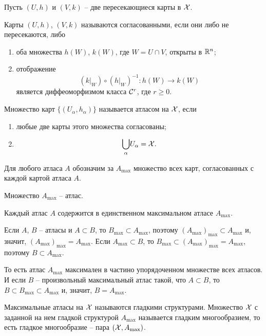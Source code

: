 	\begin{mdef}
		Пусть $(U, h)$ и $(V, k)$ -- две пересекающиеся карты в $\mathcal{X}$.
		
		Карты $(U, h)$, $(V, k)$ называются согласованными, если они либо не пересекаются, либо
		\begin{enumerate}
			\item оба множества $h(W)$, $k(W)$, где $W= U \cap V$, открыты в $\mathbb{R}^n$;
			\item отображение
			$$
				\left( \left. k \right|_W \right) \circ \left( \left. h \right|_W \right)^{-1}\colon h(W) \to k(W)
			$$
			является диффеоморфизмом класса $\mathcal{C}^r$, где $r \ge 0$.
		\end{enumerate}
	\end{mdef}

	\begin{mdef}
		Множество карт $\{ (U_\alpha, h_\alpha)\}$ называется атласом на $\mathcal{X}$, если
		\begin{enumerate}
			\item любые две карты этого множества согласованы;
			\item $$
				\underset{\alpha}{\bigcup}U_\alpha = \mathcal{X}.
			$$
		\end{enumerate}
	\end{mdef}
	
	Для любого атласа $A$ обозначим за $A_{\max}$ множество всех карт, согласованных с каждой картой атласа $A$.
	
	\begin{theorem}
		Множество $A_{\max}$ -- атлас.
	\end{theorem}

	\begin{corollary}
		Каждый атлас $A$ содержится в единственном максимальном атласе $A_{\max}$.
	\end{corollary}
	\begin{Proof}
		Если $A$, $B$ -- атласы и $A \subset B$, то $B_{\max} \subset A_{\max}$, поэтому $(A_{\max})_{\max} \subset A_{\max}$ и, значит, $(A_{\max})_{\max} = A_{\max}$.
	Если $A_{\max} \subset B$, то $B_{\max}\subset (A_{\max})_{\max} = A_{\max}$, поэтому $B \subset A_{\max}$.
	
	То есть атлас $A_{\max}$ максимален в частино упорядоченном множестве всех атласов. И если $B$ -- произвольный максимальный атлас такой, что $A \subset B$, то $B \subset B_{\max} \subset A_{\max}$ и, значит, $B = A_{\max}$.
	\end{Proof}

	\begin{mdef}
		Максимальные атласы на $\mathcal{X}$ называются гладкими структурами. Множество $\mathcal{X}$ с заданной на нем гладкой структурой $A_{\max}$ называется гладким многообразием, то есть гладкое многообразие -- пара $(\mathcal{X}, A_{\max})$.
	\end{mdef}

